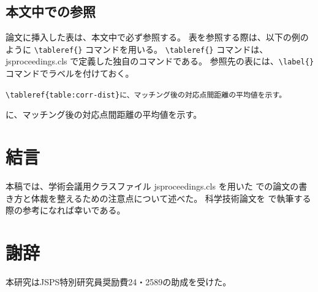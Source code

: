 \documentclass[uplatex, twocolumn, 9pt]{jsproceedings}
\begin{document}
\subsection{本文中での参照}
論文に挿入した表は、本文中で必ず参照する。
表を参照する際は、以下の例のように \verb*|\tableref{}| コマンドを用いる。
\verb*|\tableref{}| コマンドは、jsproceedings.cls で定義した独自のコマンドである。
参照先の表には、\verb*|\label{}| コマンドでラベルを付けておく。
\begin{description}[style=nextline]
  \item[\LaTeX ソース]%
  \verb|\tableref{table:corr-dist}に、マッチング後の対応点間距離の平均値を示す。|
  \item[出力]%
  に、マッチング後の対応点間距離の平均値を示す。
\end{description}


\section{結言}
本稿では、学術会議用クラスファイル jsproceedings.cls を用いた \LaTeXe での論文の書き方と体裁を整えるための注意点について述べた。
科学技術論文を \LaTeXe で執筆する際の参考になれば幸いである。

\section*{謝辞}
本研究はJSPS特別研究員奨励費24・2589の助成を受けた。
\end{document}
